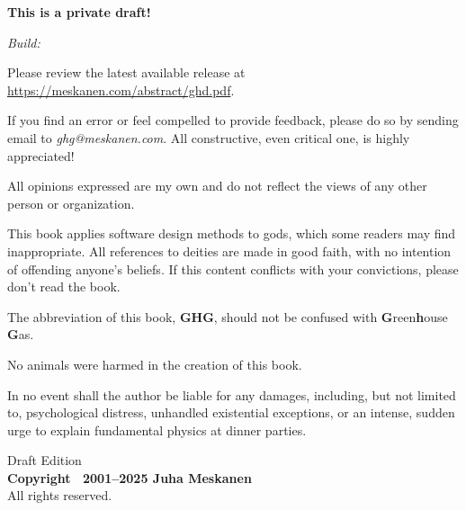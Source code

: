 \newpage
\thispagestyle{empty} %
\vspace*{\fill}       %

\begin{flushleft}
    \small
    
    \textbf{This is a private draft!}

    \textit{Build: \DTMnow}

    Please review the latest available release at \href{https://meskanen.com/abstract/ghd.pdf}{https://meskanen.com/abstract/ghd.pdf}.

    If you find an error or feel compelled to provide feedback, please do so by
    sending email to \textit{ghg@meskanen.com}. All constructive, even
    critical one, is highly appreciated!
    
    All opinions expressed are my own and do not reflect the views of any other person or organization. 

    This book applies software design methods to gods, which some readers may find inappropriate.
    All references to deities are made in good faith, with no intention of offending anyone’s beliefs.
    If this content conflicts with your convictions, please don't read the book.

    The abbreviation of this book, \textbf{GHG}, should not be confused with \textbf{G}reen\textbf{h}ouse \textbf{G}as.

    No animals were harmed in the creation of this book.

    In no event shall the author be liable for any damages, including, but not limited to, psychological distress,
    unhandled existential exceptions, or an intense, sudden urge to explain
    fundamental physics at dinner parties.
    
    \vspace{1.5em} %
    
    Draft Edition \\
    \textbf{Copyright \textcopyright\ 2001--2025 Juha Meskanen} \\
    All rights reserved.
\end{flushleft}
\newpage


